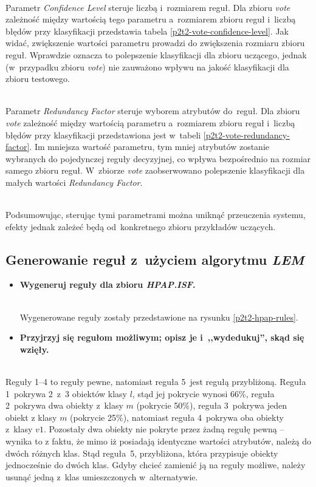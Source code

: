 \begin{itemize}
	
	\\Parametr \emph{Confidence Level} steruje liczbą i~rozmiarem reguł. Dla zbioru \emph{vote} zależność między wartością tego parametru a~rozmiarem zbioru reguł i~liczbą błędów przy klasyfikacji przedstawia tabela \ref{p2t2-vote-confidence-level}. Jak widać, zwiększenie wartości parametru prowadzi do zwiększenia rozmiaru zbioru reguł. Wprawdzie oznacza to polepszenie klasyfikacji dla zbioru uczącego, jednak (w~przypadku zbioru \emph{vote}) nie zauważono wpływu na jakość klasyfikacji dla zbioru testowego.

	
	\\Parametr \emph{Redundancy Factor} steruje wyborem atrybutów do~reguł. Dla zbioru \emph{vote} zależność między wartością parametru a~rozmiarem zbioru reguł i~liczbą błędów przy klasyfikacji przedstawiona jest w~tabeli \ref{p2t2-vote-redundancy-factor}. Im mniejsza wartość parametru, tym mniej atrybutów zostanie wybranych do pojedynczej reguły decyzyjnej, co wpływa bezpośrednio na rozmiar samego zbioru reguł. W~zbiorze \emph{vote} zaobserwowano polepszenie klasyfikacji dla małych wartości \emph{Redundancy Factor}.

	\\Podsumowując, sterując tymi parametrami można uniknąć przeuczenia systemu, efekty jednak zależeć będą od~konkretnego zbioru przykładów uczących.
\end{itemize}


	\subsection{Generowanie reguł z~użyciem algorytmu \emph{LEM}}

\begin{itemize}
\item \textbf{Wygeneruj reguły dla zbioru \emph{HPAP.ISF}.}

	
	\\Wygenerowane reguły zostały przedstawione na rysunku \ref{p2t2-hpap-rules}.

\item \textbf{Przyjrzyj się regułom możliwym; opisz je i~,,wydedukuj'', skąd się wzięły.}
\end{itemize}

	\\Reguły 1--4 to reguły pewne, natomiast reguła 5~jest regułą przybliżoną. Reguła 1~pokrywa 2~z~3 obiektów klasy $l$, stąd jej pokrycie wynosi 66\%, reguła 2~pokrywa dwa obiekty z~klasy $m$ (pokrycie 50\%), reguła 3~pokrywa jeden obiekt z klasy $m$ (pokrycie 25\%), natomiast reguła 4~pokrywa oba obiekty z~klasy $v1$. Pozostały dwa obiekty nie pokryte przez żadną regułę pewną -- wynika to z faktu, że mimo iż posiadają identyczne wartości atrybutów, należą do dwóch różnych klas. Stąd reguła~5, przybliżona, która przypisuje obiekty jednocześnie do dwóch klas. Gdyby chcieć zamienić ją na reguły możliwe, należy usunąć jedną z~klas umieszczonych w~alternatywie.

